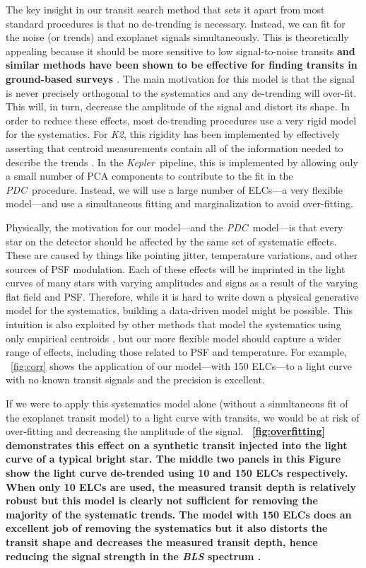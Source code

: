 \documentclass[12pt,preprint]{aastex}
\newcommand{\project}[1]{\textsl{#1}} %
\newcommand{\kepler}{\project{Kepler}}
\newcommand{\KT}{\project{K2}}
\newcommand{\pdc}{\project{PDC}}
\newcommand{\figref}[1]{\ref{fig:#1}}
\newcommand{\Fig}[1]{\figurename~\figref{#1}}
\newcommand{\response}[1]{{\color{mygreen} {\bf #1}}}
\begin{document}
The key insight in our transit search method that sets it apart from most
standard procedures is that no de-trending is necessary.
Instead, we can fit for the noise (or trends) and exoplanet signals
simultaneously.
This is theoretically appealing because it should be more sensitive to low
signal-to-noise transits \response{and similar methods have been shown to be
effective for finding transits in ground-based surveys \citep{Berta:2012}}.
The main motivation for this model is that the signal is never precisely
orthogonal to the systematics and any de-trending will over-fit.
This will, in turn, decrease the amplitude of the signal and distort its
shape.
In order to reduce these effects, most de-trending procedures use a very rigid
model for the systematics.
For \KT, this rigidity has been implemented by effectively asserting that
centroid measurements contain all of the information needed to describe the
trends \citep{Vanderburg:2014, Aigrain:2015, Crossfield:2015}.
In the \kepler\ pipeline, this is implemented by allowing only a small number
of PCA components to contribute to the fit in the \pdc\ procedure.
Instead, we will use a large number of ELCs---a very flexible model---and use
a simultaneous fitting and marginalization to avoid over-fitting.

Physically, the motivation for our model---and the \pdc\ model---is that every
star on the detector should be affected by the same set of systematic effects.
These are caused by things like pointing jitter, temperature variations, and
other sources of PSF modulation.
Each of these effects will be imprinted in the light curves of many stars with
varying amplitudes and signs as a result of the varying flat field and PSF.
Therefore, while it is hard to write down a physical generative model for the
systematics, building a data-driven model might be possible.
This intuition is also exploited by other methods that model the systematics
using only empirical centroids \citep{Vanderburg:2014, Armstrong:2014,
Aigrain:2015, Crossfield:2015}, but our more flexible model should capture a
wider range of effects, including those related to PSF and temperature.
For example, \Fig{corr} shows the application of our model---with 150
ELCs---to a light curve with no known transit signals and the precision is
excellent.

If we were to apply this systematics model alone (without a simultaneous fit
of the exoplanet transit model) to a light curve with transits, we would be at
risk of over-fitting and decreasing the amplitude of the signal.
\response{\Fig{overfitting} demonstrates this effect on a synthetic transit
injected into the light curve of a typical bright star.
The middle two panels in this Figure show the light curve de-trended using 10
and 150 ELCs respectively.
When only 10 ELCs are used, the measured transit depth is relatively robust
but this model is clearly not sufficient for removing the majority of the
systematic trends.
The model with 150 ELCs does an excellent job of removing the systematics but
it also distorts the transit shape and decreases the measured transit depth,
hence reducing the signal strength in the \project{BLS} spectrum
\citep{Kovacs:2002}.}
\end{document}
